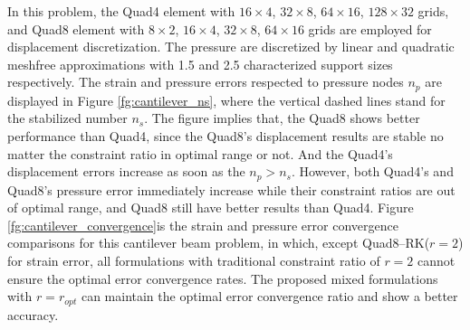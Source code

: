 In this problem, the Quad4 element with $16\times 4$, $32\times 8$, $64\times 16$, $128\times 32$ grids,
and Quad8 element with $8\times 2$, $16\times 4$, $32\times 8$, $64\times 16$ grids are employed for displacement discretization.
The pressure are discretized by linear and quadratic meshfree approximations with 1.5 and 2.5 characterized support sizes respectively.
The strain and pressure errors respected to pressure nodes $n_p$ are displayed in Figure \ref{fg:cantilever_ns}, where the vertical dashed lines stand for the stabilized number $n_s$.
The figure implies that, the Quad8 shows better performance than Quad4, since the Quad8's displacement results are stable no matter the constraint ratio in optimal range or not. And the Quad4's displacement errors increase as soon as the $n_p>n_s$. 
However, both Quad4's and Quad8's pressure error immediately increase while their constraint ratios are out of optimal range,
and Quad8 still have better results than Quad4. 
Figure \ref{fg:cantilever_convergence}is the strain and pressure error convergence comparisons for this cantilever beam problem,
in which, except Quad8--RK($r=2$) for strain error, all formulations with traditional constraint ratio of $r=2$ cannot ensure the optimal error convergence rates.
The proposed mixed formulations with $r=r_{opt}$ can maintain the optimal error convergence ratio and show a better accuracy.

